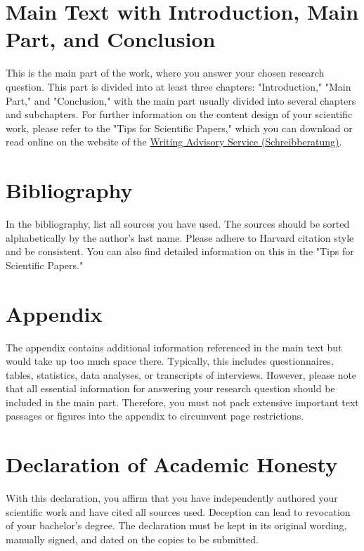 \section{Main Text with Introduction, Main Part, and Conclusion}

This is the main part of the work, where you answer your chosen research question. This part is divided into at least three chapters: "Introduction," "Main Part," and "Conclusion," with the main part usually divided into several chapters and subchapters. For further information on the content design of your scientific work, please refer to the "Tips for Scientific Papers," which you can download or read online on the website of the \href{https://www.vwl.uni-mannheim.de/studium/bachelorstudium/schreibberatung/weiterfuehrendes-material-und-vorlagen/}{\color{blue} Writing Advisory Service (Schreibberatung)}.

\section{Bibliography}
In the bibliography, list all sources you have used. The sources should be sorted alphabetically by the author's last name. Please adhere to Harvard citation style and be consistent. You can also find detailed information on this in the "Tips for Scientific Papers."

\section{Appendix}
The appendix contains additional information referenced in the main text but would take up too much space there. Typically, this includes questionnaires, tables, statistics, data analyses, or transcripts of interviews. However, please note that all essential information for answering your research question should be included in the main part. Therefore, you must not pack extensive important text passages or figures into the appendix to circumvent page restrictions.

\section{Declaration of Academic Honesty}
With this declaration, you affirm that you have independently authored your scientific work and have cited all sources used. Deception can lead to revocation of your bachelor's degree. The declaration must be kept in its original wording, manually signed, and dated on the copies to be submitted.